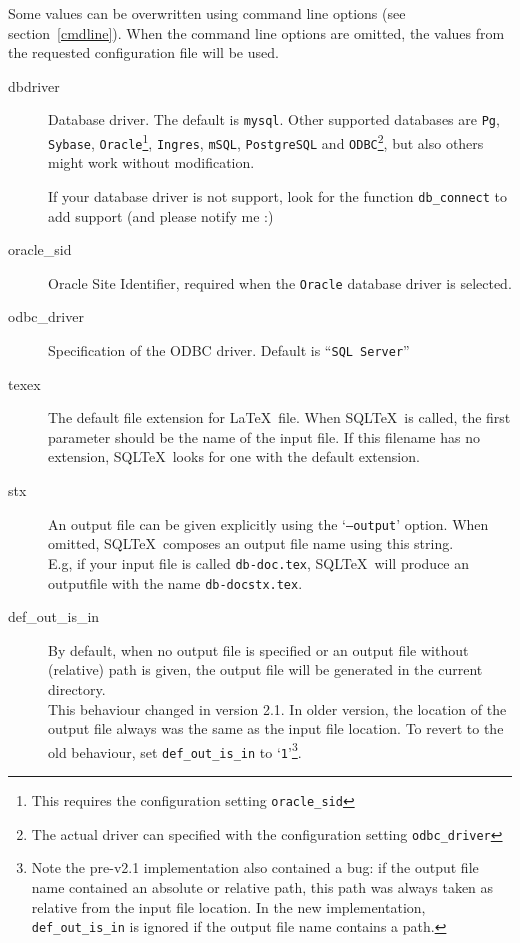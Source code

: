 \documentclass{article}
\newcommand{\vs}{\vspace{3mm}}
\begin{document}
\vs

Some values can be overwritten using command line options (see section~\ref{cmdline}). When the command line options are omitted, the values from the requested configuration file will be used.

\begin{description}

\item[dbdriver] Database driver. The default is \texttt{mysql}.
Other supported databases are \texttt{Pg}, \texttt{Sybase}, \texttt{Oracle}\footnote{ This requires the configuration setting \texttt{oracle\_sid}}, \texttt{Ingres}, \texttt{mSQL}, \texttt{PostgreSQL} and \texttt{ODBC}\footnote{ The actual driver can specified with the configuration setting \texttt{odbc\_driver}}, but also others might work without modification. \\

\vs

If your database driver is not support, look for the function
\texttt{db\_connect} to add support (and please notify me :) 

\item[oracle\_sid] Oracle Site Identifier, required when the \texttt{Oracle} database driver is selected.

\item[odbc\_driver] Specification of the ODBC driver. Default is ``\texttt{SQL Server}''
 

\item[texex] The default file extension for \LaTeX\ file. When SQL\TeX\ is called, the first
parameter should be the name of the input file. If this filename has no extension,
SQL\TeX\ looks for one with the default extension.

\item[stx] An output file can be given explicitly using the `\texttt{--output}' option. When omitted,
SQL\TeX\ composes an output file name using this string.\\
E.g, if your input file is called \texttt{db-doc.tex}, SQL\TeX\ will produce an
outputfile with the name \texttt{db-docstx.tex}.

\item[def\_out\_is\_in] By default, when no output file is specified or an output file without (relative) path is given, the output file will be generated in the current directory.\\
This behaviour changed in version 2.1. In older version, the location of the output file always was the same as the input file location. To revert to the old behaviour, set \texttt{def\_out\_is\_in} to `\texttt{1}'\footnote{ Note the pre-v2.1 implementation also contained a bug: if the output file name contained an absolute or relative path, this path was always taken as relative from the input file location. In the new implementation, \texttt{def\_out\_is\_in} is ignored if the output file name contains a path.}.
  

\end{description}
\end{document}
